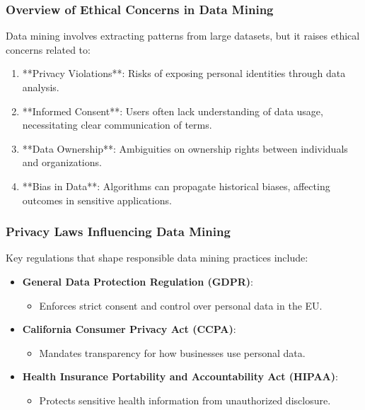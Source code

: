 \documentclass[aspectratio=169]{beamer}
\begin{document}
\frame{\titlepage}

\begin{frame}[fragile]
    \maketitle
\end{frame}

\begin{frame}[fragile]
    \frametitle{Overview of Ethical Concerns in Data Mining}
    
    Data mining involves extracting patterns from large datasets, but it raises ethical concerns related to:
    
    \begin{enumerate}
        \item **Privacy Violations**: Risks of exposing personal identities through data analysis.
        \item **Informed Consent**: Users often lack understanding of data usage, necessitating clear communication of terms.
        \item **Data Ownership**: Ambiguities on ownership rights between individuals and organizations.
        \item **Bias in Data**: Algorithms can propagate historical biases, affecting outcomes in sensitive applications.
    \end{enumerate}
\end{frame}

\begin{frame}[fragile]
    \frametitle{Privacy Laws Influencing Data Mining}
    
    Key regulations that shape responsible data mining practices include:
    
    \begin{itemize}
        \item \textbf{General Data Protection Regulation (GDPR)}:
        \begin{itemize}
            \item Enforces strict consent and control over personal data in the EU.
        \end{itemize}
        
        \item \textbf{California Consumer Privacy Act (CCPA)}:
        \begin{itemize}
            \item Mandates transparency for how businesses use personal data.
        \end{itemize}
        
        \item \textbf{Health Insurance Portability and Accountability Act (HIPAA)}:
        \begin{itemize}
            \item Protects sensitive health information from unauthorized disclosure.
        \end{itemize}
    \end{itemize}
\end{frame}
\end{document}
